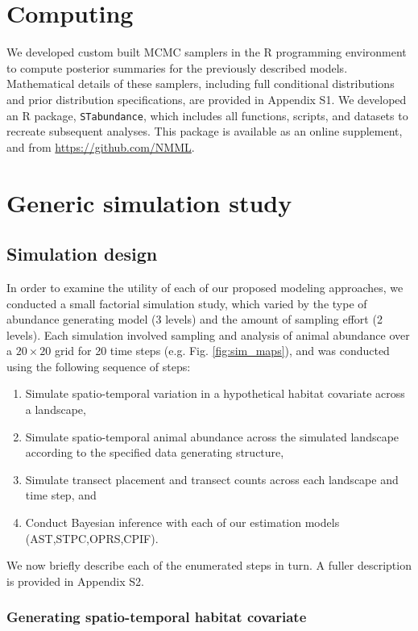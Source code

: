 \documentclass[times,mee,doublespace,]{besauth2}
\begin{document}
\section{Computing}

We developed custom built MCMC samplers in the R programming environment \citep{RTeam2012} to compute posterior summaries for the previously described models.  Mathematical details of these samplers, including full conditional distributions and prior distribution specifications, are provided in Appendix S1.  We developed an R package, \texttt{STabundance}, which includes all functions, scripts, and datasets to recreate subsequent analyses.  This package is available as an online supplement, and from \url{https://github.com/NMML}.

\section{Generic simulation study}

\subsection{Simulation design}

In order to examine the utility of each of our proposed modeling approaches, we conducted a small factorial simulation study, which varied by the type of abundance generating model (3 levels) and the amount of sampling effort (2 levels).  Each simulation involved sampling and analysis of animal abundance over a $20 \times 20$ grid for 20 time steps (e.g. Fig. \ref{fig:sim_maps}), and was conducted using the following sequence of steps:
\begin{enumerate}
 \item Simulate spatio-temporal variation in a hypothetical habitat covariate across a landscape,
 \item Simulate spatio-temporal animal abundance across the simulated landscape according to the specified data generating structure,
 \item Simulate transect placement and transect counts across each landscape and time step, and
 \item Conduct Bayesian inference with each of our estimation models (AST,STPC,OPRS,CPIF).
\end{enumerate}
We now briefly describe each of the enumerated steps in turn.  A fuller description is provided in Appendix S2.

\subsubsection{Generating spatio-temporal habitat covariate}
\end{document}
